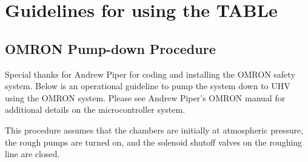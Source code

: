 \chapter{Guidelines for using the TABLe}
\label{appendix:TABLe_manual}

\section{OMRON Pump-down Procedure}
\label{sec:OMRON_instructions}

Special thanks for Andrew Piper for coding and installing the OMRON safety system. Below is an operational guideline to pump the system down to UHV using the OMRON system. Please see Andrew Piper's OMRON manual for additional details on the microcontroller system.

This procedure assumes that the chambers are initially at atmospheric pressure, the rough pumps are turned on, and the solenoid shutoff valves on the roughing line are closed.

